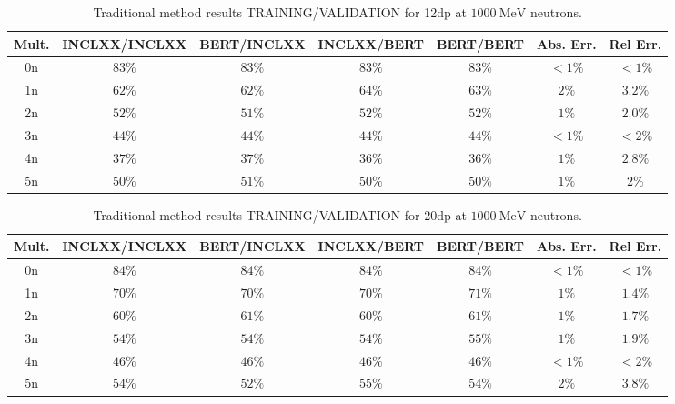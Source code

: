 \documentclass[10pt,a4paper]{report}
\newcommand{\MeV}[0]{\ \textrm{MeV}}
\begin{document}
\begin{table}[htbp] 
\centering
\caption{Traditional method results TRAINING/VALIDATION for \textrm{12dp} at ${1000 \MeV}$ neutrons.}
\label{tab:12dp1000}
\begin{tabular}{| c | c c c c | c c |} 
\hline
Mult. & INCLXX/INCLXX & BERT/INCLXX & INCLXX/BERT & BERT/BERT & Abs. Err. & Rel Err.   \\
\hline
0n    & ${83 \%}$     & ${83 \%}$   & ${83 \%}$   & ${83 \%}$ & ${<1 \%}$ & ${<1 \%}$  \\
1n    & ${62 \%}$     & ${62 \%}$   & ${64 \%}$   & ${63 \%}$ & ${2 \%}$  & ${3.2 \%}$ \\
2n    & ${52 \%}$     & ${51 \%}$   & ${52 \%}$   & ${52 \%}$ & ${1 \%}$  & ${2.0 \%}$ \\
3n    & ${44 \%}$     & ${44 \%}$   & ${44 \%}$   & ${44 \%}$ & ${<1 \%}$ & ${<2 \%}$  \\
4n    & ${37 \%}$     & ${37 \%}$   & ${36 \%}$   & ${36 \%}$ & ${1 \%}$  & ${2.8 \%}$ \\
5n    & ${50 \%}$     & ${51 \%}$   & ${50 \%}$   & ${50 \%}$ & ${1 \%}$  & ${2 \%}$   \\
\hline
\end{tabular}
\end{table}

\begin{table}[htbp] 
\centering
\caption{Traditional method results TRAINING/VALIDATION for \textrm{20dp} at ${1000 \MeV}$ neutrons.}
\label{tab:20dp1000}
\begin{tabular}{| c | c c c c | c c |} 
\hline
Mult. & INCLXX/INCLXX & BERT/INCLXX & INCLXX/BERT & BERT/BERT & Abs. Err. & Rel Err.   \\
\hline
0n    & ${84 \%}$     & ${84 \%}$   & ${84 \%}$   & ${84 \%}$ & ${<1 \%}$ & ${<1 \%}$  \\
1n    & ${70 \%}$     & ${70 \%}$   & ${70 \%}$   & ${71 \%}$ & ${1 \%}$  & ${1.4 \%}$ \\
2n    & ${60 \%}$     & ${61 \%}$   & ${60 \%}$   & ${61 \%}$ & ${1 \%}$  & ${1.7 \%}$ \\
3n    & ${54 \%}$     & ${54 \%}$   & ${54 \%}$   & ${55 \%}$ & ${1 \%}$  & ${1.9 \%}$ \\
4n    & ${46 \%}$     & ${46 \%}$   & ${46 \%}$   & ${46 \%}$ & ${<1 \%}$ & ${<2 \%}$  \\
5n    & ${54 \%}$     & ${52 \%}$   & ${55 \%}$   & ${54 \%}$ & ${2 \%}$  & ${3.8 \%}$ \\
\hline
\end{tabular}
\end{table}
\end{document}
